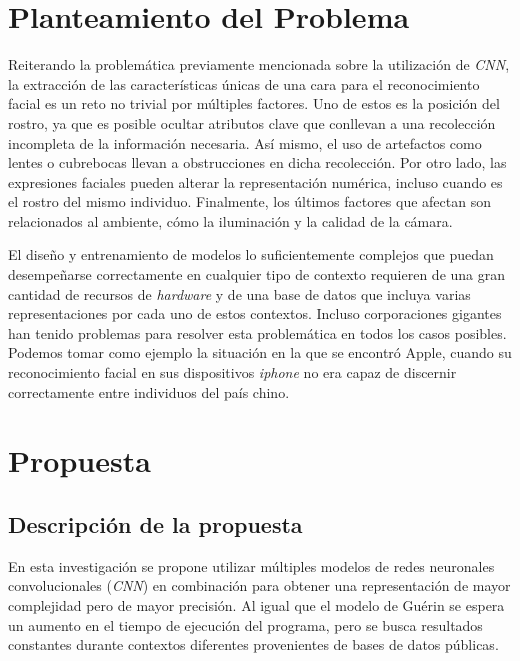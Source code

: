 \documentclass[letterpaper, 10 pt, conference]{ieeeconf}  %
\begin{document}
    \section{Planteamiento del Problema}
    Reiterando la problemática previamente mencionada sobre la utilización de \textit{CNN},
    la extracción de las características únicas de una cara para el reconocimiento facial
    es un reto no trivial por múltiples factores. Uno de estos es la posición del rostro,
    ya que es posible ocultar atributos clave que conllevan a una recolección incompleta
    de la información necesaria. Así mismo, el uso de artefactos como lentes o cubrebocas
    llevan a obstrucciones en dicha recolección. Por otro lado, las expresiones faciales
    pueden alterar la representación numérica, incluso cuando es el rostro del mismo individuo.
    Finalmente, los últimos factores que afectan son relacionados al ambiente, cómo la iluminación
    y la calidad de la cámara. \cite{Bodini2019}

    El diseño y entrenamiento de modelos lo suficientemente complejos que puedan desempeñarse
    correctamente en cualquier tipo de contexto requieren de una gran cantidad de recursos de
    \textit{hardware} y de una base de datos que incluya varias representaciones por cada uno
    de estos contextos. Incluso corporaciones gigantes han tenido problemas para resolver esta
    problemática en todos los casos posibles. Podemos tomar como ejemplo la situación en la que
    se encontró Apple, cuando su reconocimiento facial en sus dispositivos \textit{iphone} no
    era capaz de discernir correctamente entre individuos del país chino. \cite{Birchall2017}


    \section{Propuesta}

    \subsection{Descripción de la propuesta}
    En esta investigación se propone utilizar múltiples modelos de redes neuronales convolucionales
    (\textit{CNN}) en combinación para obtener una representación de mayor complejidad pero de
    mayor precisión. Al igual que el modelo de Guérin \cite{CombiningCNN} se espera un aumento 
    en el tiempo de ejecución del programa, pero se busca resultados constantes durante contextos
    diferentes provenientes de bases de datos públicas.
\end{document}
